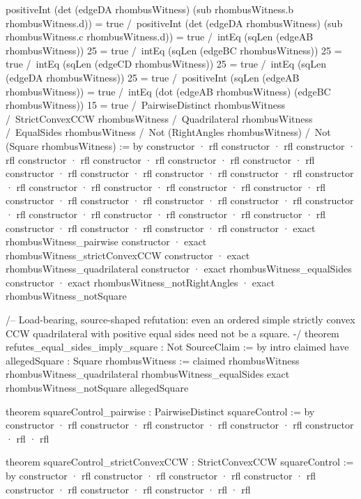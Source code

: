 \documentclass[11pt]{article}
\begin{document}
\begin{Vlean}
    positiveInt (det (edgeDA rhombusWitness)
      (sub rhombusWitness.b rhombusWitness.d)) = true /\
    positiveInt (det (edgeDA rhombusWitness)
      (sub rhombusWitness.c rhombusWitness.d)) = true /\
    intEq (sqLen (edgeAB rhombusWitness)) 25 = true /\
    intEq (sqLen (edgeBC rhombusWitness)) 25 = true /\
    intEq (sqLen (edgeCD rhombusWitness)) 25 = true /\
    intEq (sqLen (edgeDA rhombusWitness)) 25 = true /\
    positiveInt (sqLen (edgeAB rhombusWitness)) = true /\
    intEq (dot (edgeAB rhombusWitness) (edgeBC rhombusWitness)) 15 = true /\
    PairwiseDistinct rhombusWitness /\
    StrictConvexCCW rhombusWitness /\
    Quadrilateral rhombusWitness /\
    EqualSides rhombusWitness /\
    Not (RightAngles rhombusWitness) /\
    Not (Square rhombusWitness) := by
  constructor
  · rfl
  constructor
  · rfl
  constructor
  · rfl
  constructor
  · rfl
  constructor
  · rfl
  constructor
  · rfl
  constructor
  · rfl
  constructor
  · rfl
  constructor
  · rfl
  constructor
  · rfl
  constructor
  · rfl
  constructor
  · rfl
  constructor
  · rfl
  constructor
  · rfl
  constructor
  · rfl
  constructor
  · rfl
  constructor
  · rfl
  constructor
  · rfl
  constructor
  · rfl
  constructor
  · rfl
  constructor
  · rfl
  constructor
  · rfl
  constructor
  · rfl
  constructor
  · rfl
  constructor
  · rfl
  constructor
  · rfl
  constructor
  · rfl
  constructor
  · rfl
  constructor
  · exact rhombusWitness_pairwise
  constructor
  · exact rhombusWitness_strictConvexCCW
  constructor
  · exact rhombusWitness_quadrilateral
  constructor
  · exact rhombusWitness_equalSides
  constructor
  · exact rhombusWitness_notRightAngles
  · exact rhombusWitness_notSquare

/-- Load-bearing, source-shaped refutation: even an ordered simple strictly
convex CCW quadrilateral with positive equal sides need not be a square. -/
theorem refutes_equal_sides_imply_square : Not SourceClaim := by
  intro claimed
  have allegedSquare : Square rhombusWitness :=
    claimed rhombusWitness rhombusWitness_quadrilateral
      rhombusWitness_equalSides
  exact rhombusWitness_notSquare allegedSquare

theorem squareControl_pairwise : PairwiseDistinct squareControl := by
  constructor
  · rfl
  constructor
  · rfl
  constructor
  · rfl
  constructor
  · rfl
  constructor
  · rfl
  · rfl

theorem squareControl_strictConvexCCW : StrictConvexCCW squareControl := by
  constructor
  · rfl
  constructor
  · rfl
  constructor
  · rfl
  constructor
  · rfl
  constructor
  · rfl
  constructor
  · rfl
  constructor
  · rfl
  · rfl


\end{Vlean}
\end{document}
